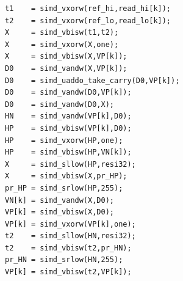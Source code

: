 \documentclass[conference]{IEEEtran}
\begin{document}
\begin{figure}[!htb]
    \begin{lstlisting}[frame=single, xleftmargin=3.5ex]
t1    = simd_vxorw(ref_hi,read_hi[k]);
t2    = simd_vxorw(ref_lo,read_lo[k]);
X     = simd_vbisw(t1,t2); 
X     = simd_vxorw(X,one); 
X     = simd_vbisw(X,VP[k]);
D0    = simd_vandw(X,VP[k]);
D0    = simd_uaddo_take_carry(D0,VP[k]);
D0    = simd_vandw(D0,VP[k]);
D0    = simd_vandw(D0,X);
HN    = simd_vandw(VP[k],D0);
HP    = simd_vbisw(VP[k],D0);
HP    = simd_vxorw(HP,one);
HP    = simd_vbisw(HP,VN[k]);	
X     = simd_sllow(HP,resi32);
X     = simd_vbisw(X,pr_HP);
pr_HP = simd_srlow(HP,255);
VN[k] = simd_vandw(X,D0);
VP[k] = simd_vbisw(X,D0);
VP[k] = simd_vxorw(VP[k],one);
t2    = simd_sllow(HN,resi32);
t2    = simd_vbisw(t2,pr_HN);
pr_HN = simd_srlow(HN,255);
VP[k] = simd_vbisw(t2,VP[k]);	
    \end{lstlisting}

\end{figure}
\end{document}
